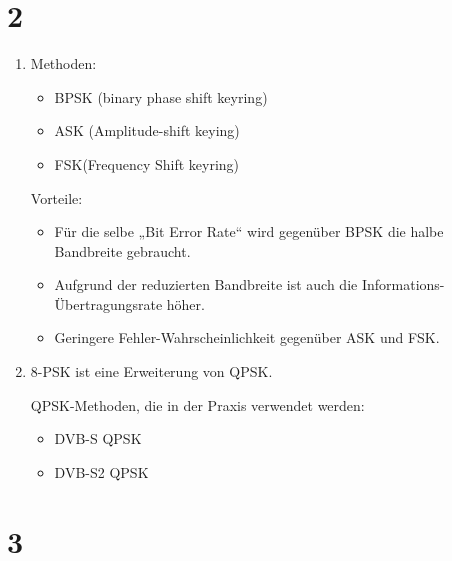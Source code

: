 \documentclass[ngerman]{scrartcl}
\begin{document}
\section*{2}

\begin{enumerate}[label=\alph*)]
  \item
  Methoden:
  \begin{itemize}
    \item BPSK (binary phase shift keyring)
    \item ASK (Amplitude-shift keying)
    \item FSK(Frequency Shift keyring)
  \end{itemize}

  Vorteile:
  \begin{itemize}
    \item Für die selbe „Bit Error Rate“ wird gegenüber BPSK die halbe Bandbreite gebraucht.
    \item Aufgrund der reduzierten Bandbreite ist auch die Informations-Übertragungsrate höher.
    \item Geringere Fehler-Wahrscheinlichkeit gegenüber ASK und FSK.
  \end{itemize}

  \addtocounter{enumi}{2}
  \item
  8-PSK ist eine Erweiterung von QPSK.

  QPSK-Methoden, die in der Praxis verwendet werden:
  \begin{itemize}
    \item DVB-S QPSK
    \item DVB-S2 QPSK
  \end{itemize}
\end{enumerate}


\section*{3}
\end{document}
